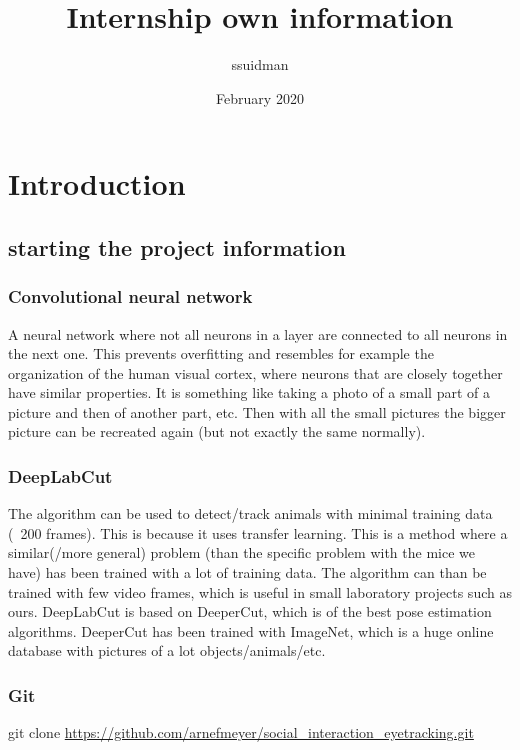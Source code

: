 \documentclass{article}
\title{Internship own information}
\author{ssuidman }
\date{February 2020}
\begin{document}
\maketitle

\section{Introduction}

\subsection{starting the project information}

\subsubsection{Convolutional neural network} 
A neural network where not all neurons in a layer are connected to all neurons in the next one. This prevents overfitting and resembles for example the organization of the human visual cortex, where neurons that are closely together have similar properties. It is something like taking a photo of a small part of a picture and then of another part, etc. Then with all the small pictures the bigger picture can be recreated again (but not exactly the same normally). 


\subsubsection{DeepLabCut}
The algorithm can be used to detect/track animals with minimal training data (~200 frames). This is because it uses transfer learning. This is a method where a similar(/more general) problem (than the specific problem with the mice we have) has been trained with a lot of training data. The algorithm can than be trained with few video frames, which is useful in small laboratory projects such as ours. DeepLabCut is based on DeeperCut, which is of the best pose estimation algorithms. DeeperCut has been trained with ImageNet, which is a huge online database with pictures of a lot objects/animals/etc. 


\subsubsection{Git}

git clone \url{https://github.com/arnefmeyer/social_interaction_eyetracking.git}
\end{document}

